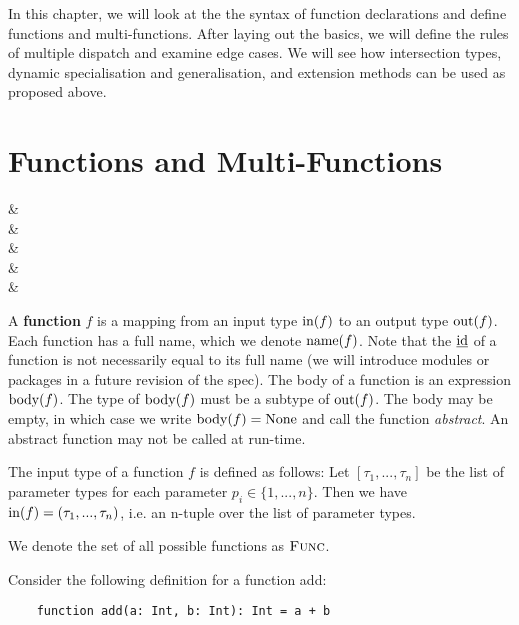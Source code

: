 \noindent In this chapter, we will look at the the syntax of function declarations and define functions and multi-functions. After laying out the basics, we will define the rules of multiple dispatch and examine edge cases. We will see how intersection types, dynamic specialisation and generalisation, and extension methods can be used as proposed above. 



\section{Functions and Multi-Functions}

\begin{grammar}
 &\produce {} \\
 &\produce {} \\
 &\produce {} \\
&\alt {} \\
 &\produce {}
\end{grammar}

\begin{definition}
	A \textbf{function} $f$ is a mapping from an input type $\operatorname{in}(f)$ to an output type $\operatorname{out}(f)$. Each function has a full name, which we denote $\operatorname{name}(f)$. Note that the $\text{\underline{id}}$ of a function is not necessarily equal to its full name (we will introduce modules or packages in a future revision of the spec). The body of a function is an expression $\operatorname{body}(f)$. The type of $\operatorname{body}(f)$ must be a subtype of $\operatorname{out}(f)$. The body may be empty, in which case we write $\operatorname{body}(f) = \text{None}$ and call the function \textit{abstract}. An abstract function may not be called at run-time.

	The input type of a function $f$ is defined as follows: Let $[\tau_1, ..., \tau_n]$ be the list of parameter types for each parameter $p_i \in \{ 1, ..., n \}$. Then we have $\operatorname{in}(f) = (\tau_1, ..., \tau_n)$, i.e. an n-tuple over the list of parameter types.

	We denote the set of all possible functions as $\textsc{Func}$.
\end{definition}

\noindent Consider the following definition for a function add:
\begin{lstlisting}
    function add(a: Int, b: Int): Int = a + b
\end{lstlisting}
	
